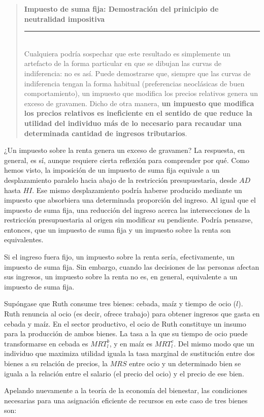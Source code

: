 \documentclass[10pt,a4paper]{article}
\newenvironment{specialblock}[1]{%
      \begin{quote} %
      \small %
      \noindent\textbf{#1}\\[-0.3em] %
      \rule{\linewidth}{0.4pt}\\[0.6em]}{
      \end{quote}}
\begin{document}
\begin{specialblock}{Impuesto de suma fija: Demostración del prinicipio de neutralidad impositiva}
    Cualquiera podría sospechar que este resultado es simplemente un artefacto de la forma particular en que se dibujan las curvas de indiferencia: no es así. Puede demostrarse que, siempre que las curvas de indiferencia tengan la forma habitual (preferencias neoclásicas de buen comportamiento), un impuesto que modifica los precios relativos genera un exceso de gravamen. Dicho de otra manera, \textbf{un impuesto que modifica los precios relativos es ineficiente en el sentido de que reduce la utilidad del individuo más de lo necesario para recaudar una determinada cantidad de ingresos tributarios}.
\end{specialblock}




¿Un impuesto sobre la renta genera un exceso de gravamen? La respuesta, en general, es sí, aunque requiere cierta reflexión para comprender por qué. Como hemos visto, la imposición de un impuesto de suma fija equivale a un desplazamiento paralelo hacia abajo de la restricción presupuestaria, desde $AD$ hasta $HI$. Ese mismo desplazamiento podría haberse producido mediante un impuesto que absorbiera una determinada proporción del ingreso. Al igual que el impuesto de suma fija, una reducción del ingreso acerca las intersecciones de la restricción presupuestaria al origen sin modificar su pendiente. Podría pensarse, entonces, que un impuesto de suma fija y un impuesto sobre la renta son equivalentes.

Si el ingreso fuera fijo, un impuesto sobre la renta sería, efectivamente, un impuesto de suma fija. Sin embargo, cuando las decisiones de las personas afectan sus ingresos, un impuesto sobre la renta no es, en general, equivalente a un impuesto de suma fija.

Supóngase que Ruth consume tres bienes: cebada, maíz y tiempo de ocio ($l$). Ruth renuncia al ocio (es decir, ofrece trabajo) para obtener ingresos que gasta en cebada y maíz. En el sector productivo, el ocio de Ruth constituye un insumo para la producción de ambos bienes. La tasa a la que su tiempo de ocio puede transformarse en cebada es $MRT_l^b$, y en maíz es $MRT_l^c$. Del mismo modo que un individuo que maximiza utilidad iguala la tasa marginal de sustitución entre dos bienes a su relación de precios, la $MRS$ entre ocio y un determinado bien se iguala a la relación entre el salario (el precio del ocio) y el precio de ese bien.

Apelando nuevamente a la teoría de la economía del bienestar, las condiciones necesarias para una asignación eficiente de recursos en este caso de tres bienes son:
\end{document}
